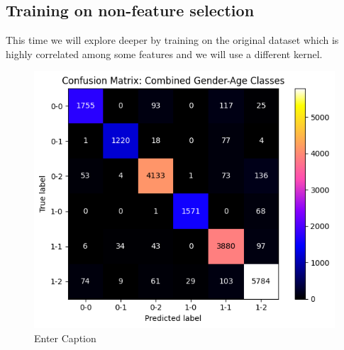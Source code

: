 \documentclass[10pt,twocolumn]{article}
\begin{document}
\subsection{Training on non-feature selection}


This time we will explore deeper by training on the original dataset which is highly correlated among some features and we will use a different kernel.

\begin{table}[H]
\centering
\caption{Classification Report for Best Performing Model}
\label{tab:svm-poly-report}
\end{table}

\begin{figure}[H]
    \centering
    \includegraphics[width=1\linewidth]{images/svm/svm-cm-poly.png}
    \caption{Enter Caption}
    \label{fig:svm-poly-cm}
\end{figure}
\end{document}

